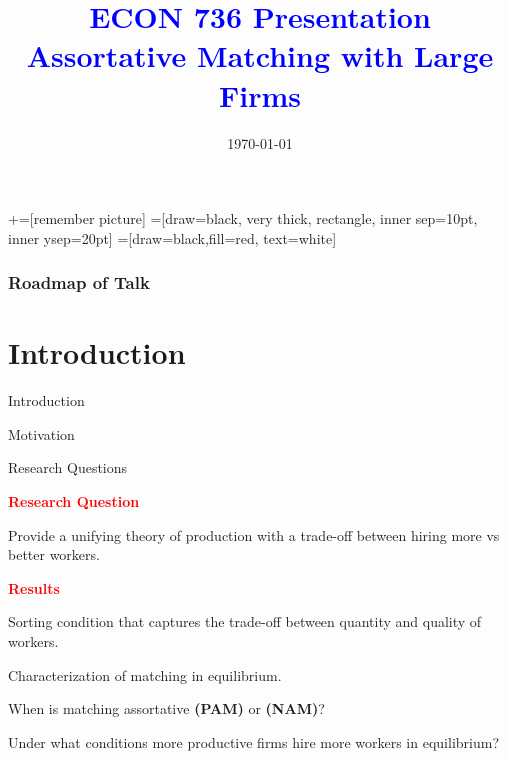 \documentclass[notes,11pt, aspectratio=169]{beamer}
\title[]{\textcolor{blue}{ECON 736 Presentation \\ Assortative Matching with Large Firms}}
\author[MVB]{}
\institute[UW-Madison]{Mitchell Valdes-Bobes}
\date{\today}
\newenvironment{wideitemize}{\itemize\addtolength{\itemsep}{10pt}}{\enditemize}
\begin{document}
\newcommand\marktopleft[1]{%
    \tikz[overlay,remember picture] 
        \node (marker-#1-a) at (-.3em,.3em) {};%
}
\newcommand\markbottomright[2]{%
    \tikz[overlay,remember picture] 
        \node (marker-#1-b) at (0em,0em) {};%
}
+=[remember picture] 
 =[draw=black, very thick, rectangle, inner sep=10pt, inner ysep=20pt]
 =[draw=black,fill=red, text=white]

\begin{frame}
	\maketitle
\end{frame}
\begin{frame}
	\frametitle{Roadmap of Talk}
	\tableofcontents
\end{frame}

\section{Introduction}
\begin{frame}{Introduction}
\end{frame}

\begin{frame}{Motivation}
\end{frame}

\begin{frame}{Research Questions}
	\begin{wideitemize}
	\item \textcolor{red}{\textbf{Research Question}}
	\begin{wideitemize}
		\item Provide a unifying theory of production with a trade-off between hiring more vs better workers.
	\end{wideitemize}

	\pause

	\item \textcolor{red}{\textbf{Results}}
	\begin{wideitemize}
		\item Sorting condition that captures the trade-off between quantity and quality of workers.
		\item Characterization of matching in equilibrium.
		\item When is matching assortative \textbf{(PAM)} or \textbf{(NAM)}?
		\item Under what conditions more productive firms hire more workers in equilibrium?
	\end{wideitemize}
\end{wideitemize}

\end{frame}
\end{document}
